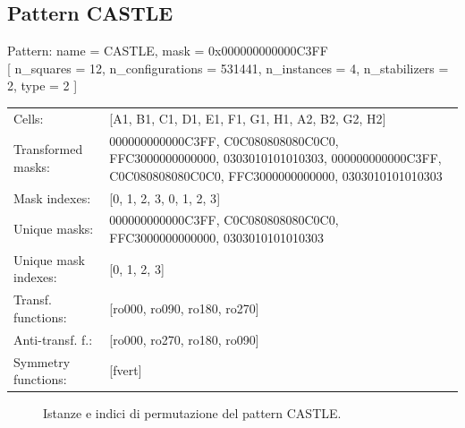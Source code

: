 \newpage

\subsection{Pattern CASTLE}

\begin{tcolorbox}[sharp corners, fontupper=\ttfamily\small, colback=white]
  \noindent Pattern: name = CASTLE, mask = 0x000000000000C3FF\\
  {[} n\_squares = 12, n\_configurations = 531441,
  n\_instances = 4, n\_stabilizers = 2, type = 2 { ]}\\[1.0ex]
  \begin{tabularx}{\textwidth}{@{} p{3.5cm} X @{}}
    Cells:               & {[}A1, B1, C1, D1, E1, F1, G1, H1, A2, B2, G2, H2{]}\\[0.5ex]
    Transformed masks:   & 000000000000C3FF, C0C080808080C0C0, FFC3000000000000, 0303010101010303, 000000000000C3FF, C0C080808080C0C0, FFC3000000000000, 0303010101010303\\[0.5ex]
    Mask indexes:        & {[}0, 1, 2, 3, 0, 1, 2, 3{]}\\[0.5ex]
    Unique masks:        & 000000000000C3FF, C0C080808080C0C0, FFC3000000000000, 0303010101010303\\[0.5ex]
    Unique mask indexes: & {[}0, 1, 2, 3{]}\\[0.5ex]
    Transf. functions:   & {[}ro000, ro090, ro180, ro270{]}\\[0.5ex]
    Anti-transf. f.:     & {[}ro000, ro270, ro180, ro090{]}\\[0.5ex]
    Symmetry functions:  & {[}fvert{]}\\[0.5ex]
  \end{tabularx}
\end{tcolorbox}

\begin{figure}[htbp]
  \centering
   \hfill
   \hfill
   \hfill
  \vspace{0.3cm}
   \hfill
   \hfill
   \hfill
  \caption{Istanze e indici di permutazione del pattern CASTLE.}
\end{figure}

